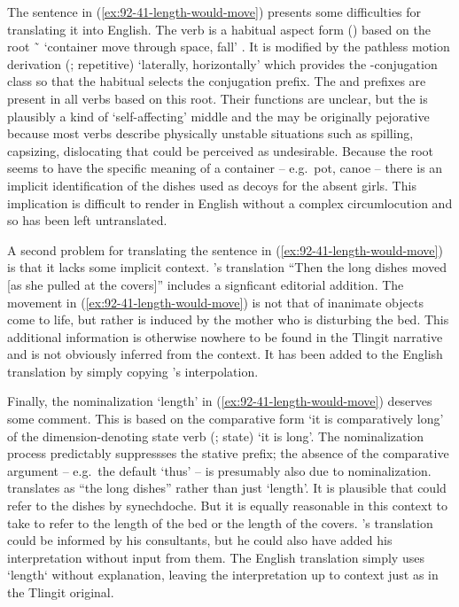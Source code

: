 The sentence in (\ref{ex:92-41-length-would-move}) presents some difficulties for translating it into English.
The verb  is a habitual aspect form () based on the root  \~\  ‘container move through space, fall’ \parencites[f02/28–30]{leer:1973}[796]{leer:1976}.
It is modified by the pathless motion derivation (;  repetitive) ‘laterally, horizontally’ which provides the -conjugation class so that the habitual selects the  conjugation prefix.
The  and  prefixes are present in all verbs based on this root.
Their functions are unclear, but the  is plausibly a kind of ‘self-affecting’ middle and the  may be originally pejorative because most verbs describe physically unstable situations such as spilling, capsizing, dislocating that could be perceived as undesirable.
Because the root seems to have the specific meaning of a container – e.g.\ pot, canoe – there is an implicit identification of the dishes used as decoys for the absent girls.
This implication is difficult to render in English without a complex circumlocution and so has been left untranslated.

A second problem for translating the sentence in (\ref{ex:92-41-length-would-move}) is that it  lacks some implicit context.
\citeauthor{swanton:1909}’s translation “Then the long dishes moved [as she pulled at the covers]” includes a signficant editorial addition.
The movement in (\ref{ex:92-41-length-would-move}) is not that of inanimate objects come to life, but rather is induced by the mother who is disturbing the bed.
This additional information is otherwise nowhere to be found in the Tlingit narrative and is not obviously inferred from the context.
It has been added to the English translation by simply copying \citeauthor{swanton:1909}’s interpolation.

Finally, the nominalization  ‘length’ in (\ref{ex:92-41-length-would-move}) deserves some comment.
This is based on the comparative form  ‘it is comparatively long’ of the dimension-denoting state verb  (;  state) ‘it is long’.
The nominalization process predictably suppressses the  stative prefix; the absence of the comparative argument – e.g.\ the default  ‘thus’ – is presumably also due to nominalization.
\citeauthor{swanton:1909} translates  as “the long dishes” rather than just ‘length’.
It is plausible that  could refer to the  dishes by synechdoche.
But it is equally reasonable in this context to take  to refer to the length of the bed or the length of the covers.
\citeauthor{swanton:1909}’s translation could be informed by his consultants, but he could also have added his interpretation without input from them.
The English translation simply uses ‘length‘ without explanation, leaving the interpretation up to context just as in the Tlingit original.

